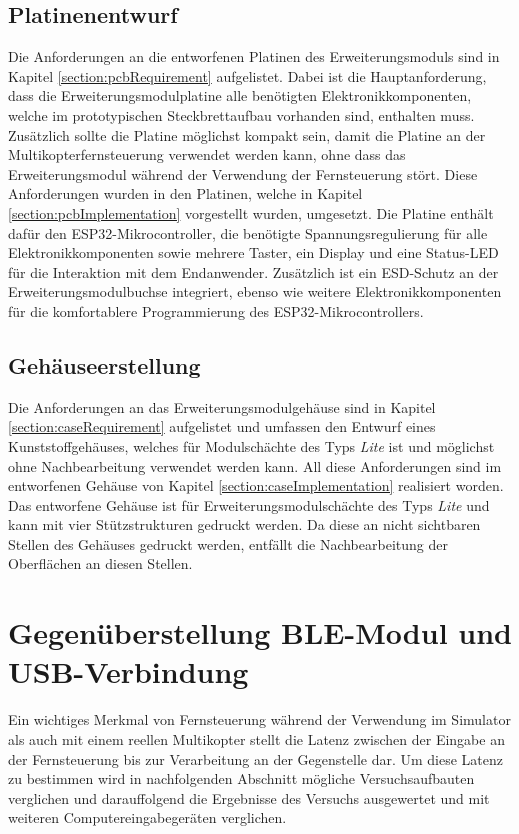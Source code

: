 \subsection{Platinenentwurf}
Die Anforderungen an die entworfenen Platinen des Erweiterungsmoduls sind in Kapitel \ref{section:pcbRequirement} aufgelistet. Dabei ist die Hauptanforderung, dass die Erweiterungsmodulplatine alle benötigten Elektronikkomponenten, welche im prototypischen Steckbrettaufbau vorhanden sind, enthalten muss. Zusätzlich sollte die Platine möglichst kompakt sein, damit die Platine an der Multikopterfernsteuerung verwendet werden kann, ohne dass das Erweiterungsmodul während der Verwendung der Fernsteuerung stört. Diese Anforderungen wurden in den Platinen, welche in Kapitel \ref{section:pcbImplementation} vorgestellt wurden, umgesetzt. Die Platine enthält dafür den ESP32-Mikrocontroller, die benötigte Spannungsregulierung für alle Elektronikkomponenten sowie mehrere Taster, ein Display und eine Status-\ac{LED} für die Interaktion mit dem Endanwender. Zusätzlich ist ein \ac{ESD}-Schutz an der Erweiterungsmodulbuchse integriert, ebenso wie weitere Elektronikkomponenten für die komfortablere Programmierung des ESP32-Mikrocontrollers.

\subsection{Gehäuseerstellung}
Die Anforderungen an das Erweiterungsmodulgehäuse sind in Kapitel \ref{section:caseRequirement} aufgelistet und umfassen den Entwurf eines Kunststoffgehäuses, welches für Modulschächte des Typs \textit{Lite} ist und möglichst ohne Nachbearbeitung verwendet werden kann. All diese Anforderungen sind im entworfenen Gehäuse von Kapitel \ref{section:caseImplementation} realisiert worden. Das entworfene Gehäuse ist für Erweiterungsmodulschächte des Typs \textit{Lite} und kann mit vier Stützstrukturen gedruckt werden. Da diese an nicht sichtbaren Stellen des Gehäuses gedruckt werden, entfällt die Nachbearbeitung der Oberflächen an diesen Stellen.

\section{Gegenüberstellung \acs{BLE}-Modul und USB-Verbindung}
Ein wichtiges Merkmal von Fernsteuerung während der Verwendung im Simulator als auch mit einem reellen Multikopter stellt die Latenz zwischen der Eingabe an der Fernsteuerung bis zur Verarbeitung an der Gegenstelle dar. Um diese Latenz zu bestimmen wird in nachfolgenden Abschnitt mögliche Versuchsaufbauten verglichen und darauffolgend die Ergebnisse des Versuchs ausgewertet und mit weiteren Computereingabegeräten verglichen.


